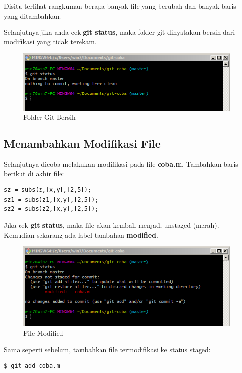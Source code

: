 \documentclass[12pt]{book}
\begin{document}
	Disitu terlihat rangkuman berapa banyak file yang berubah dan banyak baris yang ditambahkan.
	
	\newpage
	Selanjutnya jika anda cek \textbf{git status}, maka folder git dinyatakan bersih dari modifikasi yang tidak terekam.
	
	\begin{figure}[!ht]
		\centering
		\includegraphics[width=400pt]{images/git6}
		\caption{Folder Git Bersih}
	\end{figure}

	\subsection{Menambahkan Modifikasi File}
	
	Selanjutnya dicoba melakukan modifikasi pada file \textbf{coba.m}.
	Tambahkan baris berikut di akhir file:
	\begin{verbatim}
sz = subs(z,[x,y],[2,5]);
sz1 = subs(z1,[x,y],[2,5]);
sz2 = subs(z2,[x,y],[2,5]);
	\end{verbatim}

	Jika cek \textbf{git status}, maka file akan kembali menjadi unstaged (merah).
	Kemudian sekarang ada label tambahan \textbf{modified}.
	
	\begin{figure}[!ht]
		\centering
		\includegraphics[width=400pt]{images/git7}
		\caption{File Modified}
	\end{figure}

	Sama seperti sebelum, tambahkan file termodifikasi ke status staged:
	\begin{verbatim}
$ git add coba.m
	\end{verbatim}
\end{document}
